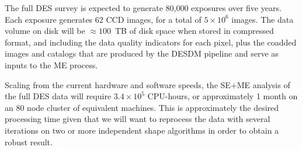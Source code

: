 \documentclass[12pt]{article}
\begin{document}
\begin{comment}
\begin{deluxetable}{lcccc}
\tabletypesize{\small}
\tablecaption{Projected Computing Purchases\label{table:computing}}
\tablewidth{0pt}
\tablehead{
	\multicolumn{1}{l}{Fiscal Year} &
	\colhead{Disk Storage}       & 
	\colhead{\$ for Storage}    & 
	\colhead{Compute Servers}   & 
	\colhead{\$ for CPU} \\
	&
	[TB] &
	&
	2010 Equivalent &
}
\startdata
2010 & 130 & 55,000 & 15 & 45,000 \\
2011 & 162 & 55,000 & 19 & 45,000 \\
2012 & 203 & 55,000 & 23 & 45,000 \\
2013 & 254 & 55,000 & 29 & 45,000 \\
2014 & 318 & 55,000 & 36 & 45,000 \\%
\enddata

\tablecomments{The number of compute nodes purchased from 2011 on is based on
the assumption that each node (26kSI2k, 104 HEP-SPEC 2006) would stay at the
performance level of a node purchased in 2010. As the performance per node will
increase over time the actual number of compute nodes after 5 years will be
significantly smaller (probably O(70)), providing a combined performance of
O(122) 2010 equivalent nodes. Prices include 40\% bulk discounts from
purchasing through the RHIC ATLAS Computing Facility at BNL.  {\bf Power,
cooling and maintence will be provided at no extra cost. }}

\end{deluxetable}

\end{comment}

The full DES survey is expected to generate 80,000 exposures over five years.
Each exposure generates 62 CCD images, for a total of $5\times 10^6$ images.
The data volume on disk will be $\approx 100$~TB of disk space when stored in
compressed format, and including the data quality indicators for each pixel,
plus the coadded images and catalogs that are produced by the DESDM pipeline
and serve as inputs to the ME process.

Scaling from the current hardware and software speeds, the SE$+$ME analysis of
the full DES data will require $3.4\times10^5$ CPU-hours, or approximately 1
month on an 80 node cluster of equivalent machines.  This is approximately the
desired processing time given that we will want to reprocess the data with
several iterations on two or more independent shape algorithms in order to
obtain a robust result.
\end{document}
